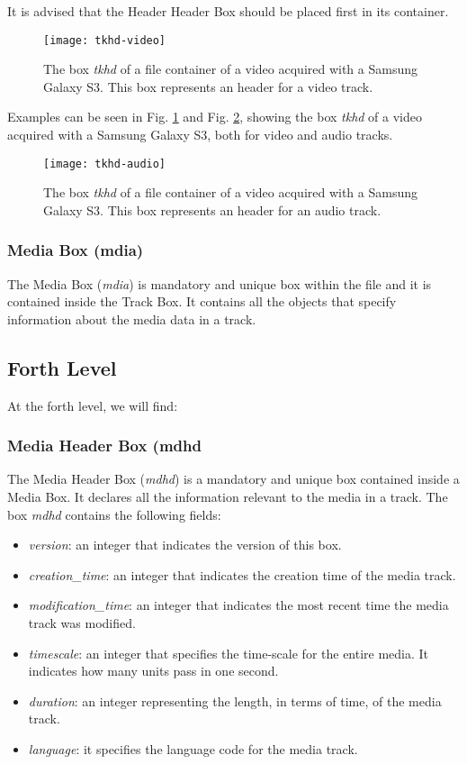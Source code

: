 It is advised that the Header Header Box should be placed first in its container.

\begin{figure}
  \centering
  \texttt{[image: tkhd-video]}
  \caption{The box \emph{tkhd} of a file container of a video acquired with a Samsung Galaxy S3. This box represents an header for a video track.}\label{fig:tkhd-video}
\end{figure}

Examples can be seen in Fig. \ref{fig:tkhd-video} and Fig. \ref{fig:tkhd-audio}, showing the box \emph{tkhd} of a video acquired with a Samsung Galaxy S3, both for video and audio tracks.

\begin{figure}
  \centering
  \texttt{[image: tkhd-audio]}
  \caption{The box \emph{tkhd} of a file container of a video acquired with a Samsung Galaxy S3. This box represents an header for an audio track.}\label{fig:tkhd-audio}
\end{figure}


\subsubsection*{Media Box (mdia)}

The Media Box (\emph{mdia}) is mandatory and unique box within the file and it is contained inside the Track Box. It contains all the objects that specify information about the media data in a track.

\subsection{Forth Level}

At the forth level, we will find:

\subsubsection*{Media Header Box (mdhd}

The Media Header Box (\emph{mdhd}) is a mandatory and unique box contained inside a Media Box. It declares all the information relevant to the media in a track. The box \emph{mdhd} contains the following fields:

\begin{itemize}
\item \emph{version}: an integer that indicates the version of this box.
\item \emph{creation\_time}: an integer that indicates the creation time of the media track.
\item \emph{modification\_time}: an integer that indicates the most recent time the media track was modified.
\item \emph{timescale}: an integer that specifies the time-scale for the entire media. It indicates how many units pass in one second.
\item \emph{duration}: an integer representing the length, in terms of time, of the media track.
\item \emph{language}: it specifies the language code for the media track.
\end{itemize}

